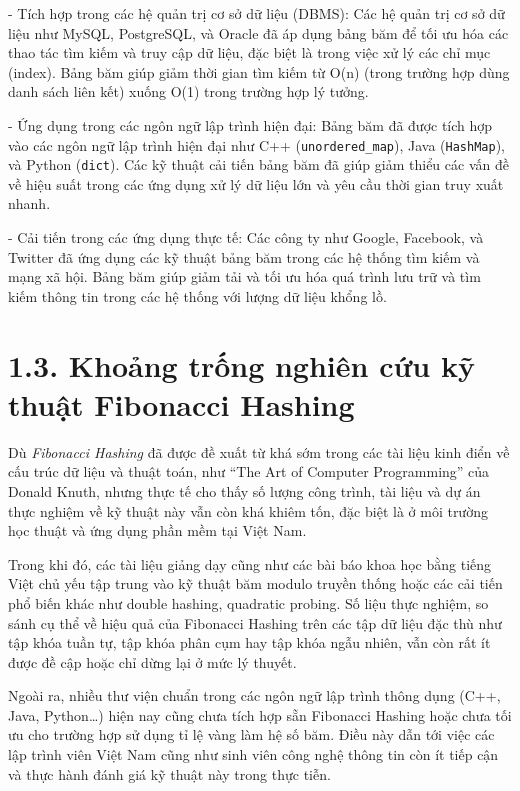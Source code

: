 \documentclass[12pt,a4paper]{report}
\begin{document}
- Tích hợp trong các hệ quản trị cơ sở dữ liệu (DBMS): Các hệ quản trị cơ sở dữ liệu như MySQL, PostgreSQL, và Oracle đã áp dụng bảng băm để tối ưu hóa các thao tác tìm kiếm và truy cập dữ liệu, đặc biệt là trong việc xử lý các chỉ mục (index). Bảng băm giúp giảm thời gian tìm kiếm từ O(n) (trong trường hợp dùng danh sách liên kết) xuống O(1) trong trường hợp lý tưởng.

- Ứng dụng trong các ngôn ngữ lập trình hiện đại: Bảng băm đã được tích hợp vào các ngôn ngữ lập trình hiện đại như C++ (\texttt{unordered\_map}), Java (\texttt{HashMap}), và Python (\texttt{dict}). Các kỹ thuật cải tiến bảng băm đã giúp giảm thiểu các vấn đề về hiệu suất trong các ứng dụng xử lý dữ liệu lớn và yêu cầu thời gian truy xuất nhanh.

- Cải tiến trong các ứng dụng thực tế: Các công ty như Google, Facebook, và Twitter đã ứng dụng các kỹ thuật bảng băm trong các hệ thống tìm kiếm và mạng xã hội. Bảng băm giúp giảm tải và tối ưu hóa quá trình lưu trữ và tìm kiếm thông tin trong các hệ thống với lượng dữ liệu khổng lồ.

\section*{1.3. Khoảng trống nghiên cứu kỹ thuật Fibonacci Hashing}
\noindent \indent Dù \textit{Fibonacci Hashing} đã được đề xuất từ khá sớm trong các tài liệu kinh điển về cấu trúc dữ liệu và thuật toán, như “The Art of Computer Programming” của Donald Knuth, nhưng thực tế cho thấy số lượng công trình, tài liệu và dự án thực nghiệm về kỹ thuật này vẫn còn khá khiêm tốn, đặc biệt là ở môi trường học thuật và ứng dụng phần mềm tại Việt Nam.

Trong khi đó, các tài liệu giảng dạy cũng như các bài báo khoa học bằng tiếng Việt chủ yếu tập trung vào kỹ thuật băm modulo truyền thống hoặc các cải tiến phổ biến khác như double hashing, quadratic probing. Số liệu thực nghiệm, so sánh cụ thể về hiệu quả của Fibonacci Hashing trên các tập dữ liệu đặc thù như tập khóa tuần tự, tập khóa phân cụm hay tập khóa ngẫu nhiên, vẫn còn rất ít được đề cập hoặc chỉ dừng lại ở mức lý thuyết.

Ngoài ra, nhiều thư viện chuẩn trong các ngôn ngữ lập trình thông dụng (C++, Java, Python…) hiện nay cũng chưa tích hợp sẵn Fibonacci Hashing hoặc chưa tối ưu cho trường hợp sử dụng tỉ lệ vàng làm hệ số băm. Điều này dẫn tới việc các lập trình viên Việt Nam cũng như sinh viên công nghệ thông tin còn ít tiếp cận và thực hành đánh giá kỹ thuật này trong thực tiễn.
\end{document}
